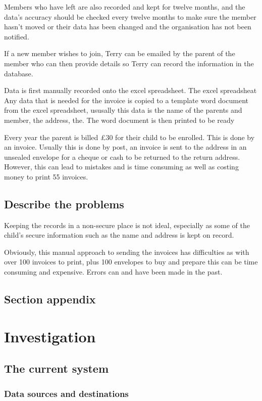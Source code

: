 Members who have left are also recorded and kept for twelve months, and the data's accuracy should be checked every twelve months to make sure the member hasn't moved or their data has been changed and the organisation has not been notified.

If a new member wishes to join, Terry can be emailed by the parent of the member who can then provide details so Terry can record the information in the database.

Data is first manually recorded onto the excel spreadsheet. The excel spreadsheat
Any data that is needed for the invoice is copied to a template word document from the excel spreadsheet, ususally this data is the name of the parents and member, the address, the. The word document is then printed to be ready

Every year the parent is billed \pounds 30 for their child to be enrolled. This is done by an invoice. Usually this is done by post, an invoice is sent to the address in an unsealed envelope for a cheque or cash to be returned to the return address. However, this can lead to mistakes and is time consuming as well as costing money to print 55 invoices.

\subsection{Describe the problems}
Keeping the records in a non-secure place is not ideal, especially as some of the child's secure information such as the name and address is kept on record.

Obviously, this manual approach to sending the invoices has difficulties as with over 100 invoices to print, plus 100 envelopes to buy and prepare this can be time consuming and expensive. Errors can and have been made in the past.


\subsection{Section appendix}

\section{Investigation}

\subsection{The current system}

\subsubsection{Data sources and destinations}

